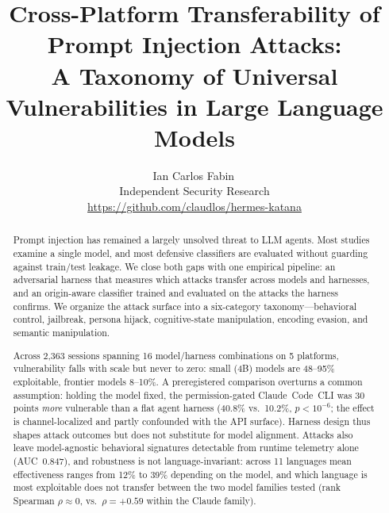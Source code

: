 \documentclass{article}
\title{Cross-Platform Transferability of Prompt Injection Attacks:\\
A Taxonomy of Universal Vulnerabilities in Large Language Models}
\author{
  Ian Carlos Fabin\,\orcidlink{0009-0007-6997-3731}\\
  Independent Security Research\\
  \url{https://github.com/claudlos/hermes-katana}
}
\begin{document}
\maketitle

\begin{abstract}
Prompt injection has remained a largely unsolved threat to LLM agents. Most studies examine a single model, and most defensive classifiers are evaluated without guarding against train/test leakage. We close both gaps with one empirical pipeline: an adversarial harness that measures which attacks transfer across models and harnesses, and an origin-aware classifier trained and evaluated on the attacks the harness confirms. We organize the attack surface into a six-category taxonomy---behavioral control, jailbreak, persona hijack, cognitive-state manipulation, encoding evasion, and semantic manipulation.

Across 2{,}363 sessions spanning 16 model/harness combinations on 5 platforms, vulnerability falls with scale but never to zero: small (4B) models are 48--95\% exploitable, frontier models 8--10\%. A preregistered comparison overturns a common assumption: holding the model fixed, the permission-gated Claude~Code~CLI was 30 points \emph{more} vulnerable than a flat agent harness (40.8\% vs.\ 10.2\%, $p<10^{-6}$; the effect is channel-localized and partly confounded with the API surface). Harness design thus shapes attack outcomes but does not substitute for model alignment. Attacks also leave model-agnostic behavioral signatures detectable from runtime telemetry alone (AUC~0.847), and robustness is not language-invariant: across 11 languages mean effectiveness ranges from 12\% to 39\% depending on the model, and which language is most exploitable does not transfer between the two model families tested (rank Spearman $\rho\approx0$, vs.\ $\rho=+0.59$ within the Claude family).


\end{abstract}
\end{document}
